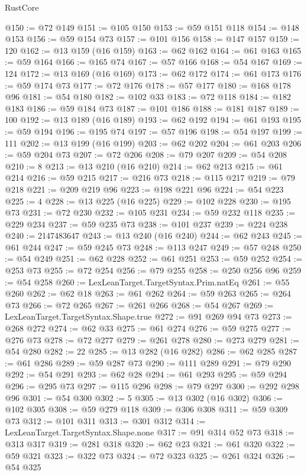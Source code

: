 \begin{lexlean}{RustCore}
\begin{coremodule}
@150 := @72 @149
@151 := @105 @150
@153 := @59 @151 @118
@154 := @148 @153
@156 := @59 @154 @73
@157 := @101 @156
@158 := @147 @157
@159 := 120
@162 := @13 @159 (@16 @159)
@163 := @62 @162
@164 := @61 @163
@165 := @59 @164
@166 := @165 @74
@167 := @57 @166
@168 := @54 @167
@169 := 124
@172 := @13 @169 (@16 @169)
@173 := @62 @172
@174 := @61 @173
@176 := @59 @174 @73
@177 := @72 @176
@178 := @57 @177
@180 := @168 @178 @96
@181 := @54 @180
@182 := @102 @33
@183 := @72 @118
@184 := @182 @183
@186 := @59 @184 @73
@187 := @101 @186
@188 := @181 @187
@189 := 100
@192 := @13 @189 (@16 @189)
@193 := @62 @192
@194 := @61 @193
@195 := @59 @194
@196 := @195 @74
@197 := @57 @196
@198 := @54 @197
@199 := 111
@202 := @13 @199 (@16 @199)
@203 := @62 @202
@204 := @61 @203
@206 := @59 @204 @73
@207 := @72 @206
@208 := @79 @207
@209 := @54 @208
@210 := 8
@213 := @13 @210 (@16 @210)
@214 := @62 @213
@215 := @61 @214
@216 := @59 @215
@217 := @216 @73
@218 := @115 @217
@219 := @79 @218
@221 := @209 @219 @96
@223 := @198 @221 @96
@224 := @54 @223
@225 := 4
@228 := @13 @225 (@16 @225)
@229 := @102 @228
@230 := @195 @73
@231 := @72 @230
@232 := @105 @231
@234 := @59 @232 @118
@235 := @229 @234
@237 := @59 @235 @73
@238 := @101 @237
@239 := @224 @238
@240 := 2147483647
@243 := @13 @240 (@16 @240)
@244 := @62 @243
@245 := @61 @244
@247 := @59 @245 @73
@248 := @113 @247
@249 := @57 @248
@250 := @54 @249
@251 := @62 @228
@252 := @61 @251
@253 := @59 @252
@254 := @253 @73
@255 := @72 @254
@256 := @79 @255
@258 := @250 @256 @96
@259 := @54 @258
@260 := LexLeanTarget.TargetSyntax.Prim.natEq
@261 := @55 @260
@262 := @62 @18
@263 := @61 @262
@264 := @59 @263
@265 := @264 @73
@266 := @72 @265
@267 := @261 @266
@268 := @54 @267
@269 := LexLeanTarget.TargetSyntax.Shape.true
@272 := @91 @269 @94 @73
@273 := @268 @272
@274 := @62 @33
@275 := @61 @274
@276 := @59 @275
@277 := @276 @73
@278 := @72 @277
@279 := @261 @278
@280 := @273 @279
@281 := @54 @280
@282 := 22
@285 := @13 @282 (@16 @282)
@286 := @62 @285
@287 := @61 @286
@289 := @59 @287 @73
@290 := @111 @289
@291 := @79 @290
@292 := @54 @291
@293 := @62 @28
@294 := @61 @293
@295 := @59 @294
@296 := @295 @73
@297 := @115 @296
@298 := @79 @297
@300 := @292 @298 @96
@301 := @54 @300
@302 := 5
@305 := @13 @302 (@16 @302)
@306 := @102 @305
@308 := @59 @279 @118
@309 := @306 @308
@311 := @59 @309 @73
@312 := @101 @311
@313 := @301 @312
@314 := LexLeanTarget.TargetSyntax.Shape.none
@317 := @91 @314 @52 @73
@318 := @313 @317
@319 := @281 @318
@320 := @62 @23
@321 := @61 @320
@322 := @59 @321
@323 := @322 @73
@324 := @72 @323
@325 := @261 @324
@326 := @54 @325

\end{coremodule}
\end{lexlean}
